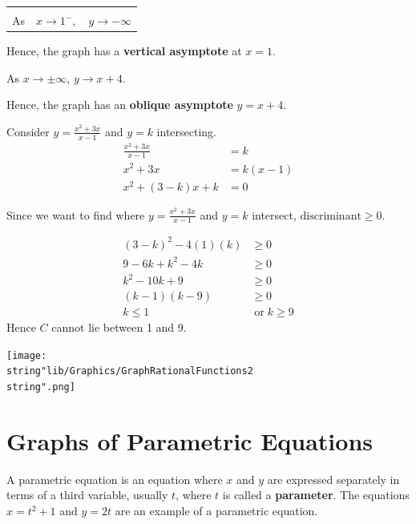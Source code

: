 \documentclass[11pt,a4paper]{book}
\begin{document}
\begin{example}{}
\begin{tasks}[label=(\alph*),label-width=3.5ex]
\begin{tabular}{>{\raggedright}p{0.6cm}>{\raggedright}p{1.8cm}>{\raggedright}p{2cm}}
\medskip{}\tabularnewline
As & $x\rightarrow1^{-},$ & $y\rightarrow-\infty$

\medskip{}\tabularnewline
\end{tabular}

Hence, the graph has a \textbf{vertical asymptote} at $x=1$.

As $x\rightarrow\pm\infty$, ${\displaystyle y\rightarrow x+4}$.

Hence, the graph has an\textbf{ oblique asymptote} ${\displaystyle y=x+4}$.

\task  Consider ${\displaystyle y=\frac{x^{2}+3x}{x-1}}$ and $y=k$ intersecting.
\begin{align*}
\frac{x^{2}+3x}{x-1} & =k\\
x^{2}+3x & =k\left(x-1\right)\\
x^{2}+\left(3-k\right)x+k & =0
\end{align*}

Since we want to find where ${\displaystyle y=\frac{x^{2}+3x}{x-1}}$
and $y=k$ intersect, $\text{discriminant}\geq0$.

\begin{align*}
\left(3-k\right)^{2}-4\left(1\right)\left(k\right) & \geq0\\
9-6k+k^{2}-4k & \geq0\\
k^{2}-10k+9 & \geq0\\
\left(k-1\right)\left(k-9\right) & \geq0\\
k\leq1 & \;\text{or}\;k\geq9
\end{align*}
Hence $C$ cannot lie between 1 and 9.

\task
\begin{center}
\texttt{[image: \\string"lib/Graphics/GraphRationalFunctions2\\string".png]}
\end{center}

\end{tasks}

\end{example}

\newpage

\section{Graphs of Parametric Equations}

A parametric equation is an equation where $x$ and $y$ are expressed
separately in terms of a third variable, usually $t$, where $t$
is called a \textbf{parameter}. The equations $x=t^{2}+1$ and $y=2t$
are an example of a parametric equation.
\end{document}
